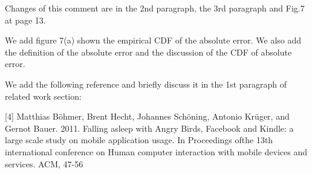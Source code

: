 Changes of this comment are in the 2nd paragraph, the 3rd paragraph and Fig.7 at page 13.

We add figure 7(a) shown the empirical CDF of the absolute error. We also add the definition of the absolute error and the discussion of the CDF of absolute error. 

\bigskip
We add the following reference and briefly discuss it in the 1st paragraph of related work section:

[4]  Matthias Böhmer, Brent Hecht, Johannes Schöning, Antonio Krüger, and Gernot Bauer. 2011. Falling asleep with Angry Birds, Facebook and Kindle: a large scale study on mobile application usage. In Proceedings ofthe 13th international conference on Human computer interaction with mobile devices and services. ACM, 47-56
